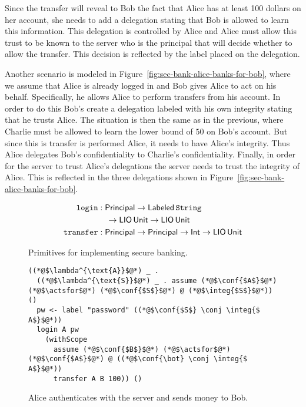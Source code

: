 Since the transfer will reveal to Bob the fact that Alice has at least 100 dollars on her account, she needs to add a delegation stating that Bob is allowed to learn this information. This delegation is controlled by Alice and Alice must allow this trust to be known to the server who is the principal that will decide whether to allow the transfer. This decision is reflected by the label placed on the delegation.

Another scenario is modeled in Figure~\ref{fig:sec-bank-alice-banks-for-bob}, where we assume that Alice is already logged in and Bob gives Alice to act on his behalf. Specifically, he allows Alice to perform transfers from his account. In order to do this Bob's create a delegation labeled with his own integrity stating that he trusts Alice. The situation is then the same as in the previous, where Charlie must be allowed to learn the lower bound of $50$ on Bob's account. But since this is transfer is performed Alice, it needs to have Alice's integrity. Thus Alice delegates Bob's confidentiality to Charlie's confidentiality. Finally, in order for the server to trust Alice's delegations the server needs to trust the integrity of Alice. This is reflected in the three delegations shown in Figure~\ref{fig:sec-bank-alice-banks-for-bob}.

\begin{figure}
    \centering
    \begin{align*}
\mathtt{login}&: \mathsf{Principal} \to \mathsf{Labeled}\,\mathtt{String} \\ &\quad \to \mathsf{LIO}\,\mathsf{Unit} \to \mathsf{LIO}\,\mathsf{Unit}\\
\mathtt{transfer}&: \mathsf{Principal} \to \mathsf{Principal} \to \mathsf{Int} \to \mathsf{LIO}\,\mathsf{Unit}
\end{align*}
    \caption{Primitives for implementing secure banking.}
    \label{fig:sec-banking-sigs}
\end{figure}

\begin{figure}
\centering
\begin{lstlisting}
((*@$\lambda^{\text{A}}$@*) _ .
  ((*@$\lambda^{\text{S}}$@*) _ . assume (*@$\conf{$A$}$@*) (*@$\actsfor$@*) (*@$\conf{$S$}$@*) @ (*@$\integ{$S$}$@*)) ()
  pw <- label "password" ((*@$\conf{$S$} \conj \integ{$ A$}$@*))
  login A pw
    (withScope
      assume (*@$\conf{$B$}$@*) (*@$\actsfor$@*) (*@$\conf{$A$}$@*) @ ((*@$\conf{\bot} \conj \integ{$ A$}$@*))
      transfer A B 100)) ()
\end{lstlisting}
\caption{Alice authenticates with the server and sends money to Bob.}
\label{fig:sec-bank-alice-send-to-bob}
\end{figure}

